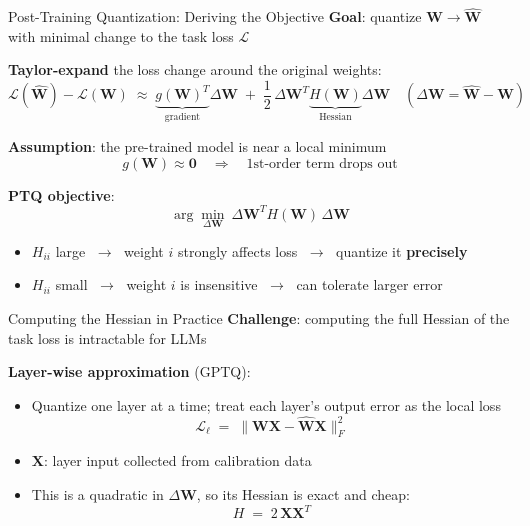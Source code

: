 \begin{frame}{Post-Training Quantization: Deriving the Objective}
  \textbf{Goal}: quantize $\mathbf{W} \to \hat{\mathbf{W}}$ with minimal change to the task loss $\mathcal{L}$

  \vspace{0.4em}
  \textbf{Taylor-expand} the loss change around the original weights:
  \[
    \mathcal{L}(\hat{\mathbf{W}}) - \mathcal{L}(\mathbf{W})
    \;\approx\;
    \underbrace{g(\mathbf{W})^T}_{\text{gradient}}\!\Delta\mathbf{W}
    \;+\;
    \frac{1}{2}\,\Delta\mathbf{W}^T \underbrace{H(\mathbf{W})}_{\text{Hessian}} \Delta\mathbf{W}
    \quad (\Delta\mathbf{W} = \hat{\mathbf{W}} - \mathbf{W})
  \]

  \vspace{0.3em}
  \textbf{Assumption}: the pre-trained model is near a local minimum
  \[
    g(\mathbf{W}) \approx \mathbf{0}
    \quad\Rightarrow\quad
    \text{1st-order term drops out}
  \]

  \vspace{0.3em}
  \textbf{PTQ objective}:
  \[
    \boxed{\;\arg\min_{\Delta\mathbf{W}}\ \Delta\mathbf{W}^T H(\mathbf{W})\,\Delta\mathbf{W}\;}
  \]

  \begin{itemize}
    \item $H_{ii}$ large $\;\rightarrow\;$ weight $i$ strongly affects loss $\;\rightarrow\;$ quantize it \textbf{precisely}
    \item $H_{ii}$ small $\;\rightarrow\;$ weight $i$ is insensitive $\;\rightarrow\;$ can tolerate larger error
  \end{itemize}
\end{frame}

\begin{frame}{Computing the Hessian in Practice}
  \textbf{Challenge}: computing the full Hessian of the task loss is intractable for LLMs

  \vspace{0.5em}
  \textbf{Layer-wise approximation} (GPTQ):
  \begin{itemize}
    \item Quantize one layer at a time; treat each layer's output error as the local loss
    \[
      \mathcal{L}_\ell \;=\; \|\mathbf{W}\mathbf{X} - \hat{\mathbf{W}}\mathbf{X}\|_F^2
    \]
    \item $\mathbf{X}$: layer input collected from calibration data
    \item This is a quadratic in $\Delta\mathbf{W}$, so its Hessian is exact and cheap:
    \[
      H \;=\; 2\,\mathbf{X}\mathbf{X}^T
    \]
  \end{itemize}
\end{frame}

